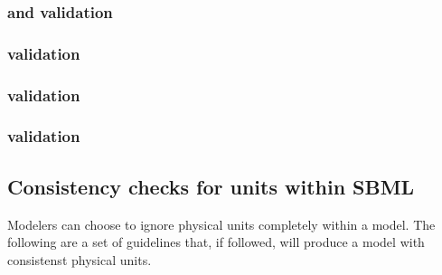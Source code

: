 \begin{sbmlenum}

\end{sbmlenum} \subsubsection*{ and  validation} \begin{sbmlenum}


\end{sbmlenum} \subsubsection*{ validation} \begin{sbmlenum}


\end{sbmlenum} \subsubsection*{ validation} \begin{sbmlenum}







\end{sbmlenum} \subsubsection*{ validation} \begin{sbmlenum}



\end{sbmlenum} 

\subsection{Consistency checks for units within SBML}

Modelers can choose to ignore physical units completely 
within a model.  The following are a set of guidelines that,
if followed, will produce a model with consistenst physical units.


